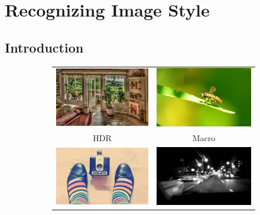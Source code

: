 \chapter{Recognizing Image Style}

\section{Introduction}
\begin{figure}[t]
\small{
\centering
\begin{subfigure}[t]{0.48\linewidth}
    \begin{tabular}{cc}
        \includegraphics[width=.43\linewidth]{../style/figures/flickrDatasetExamples/used/resized/hdr.jpg} &
    \includegraphics[width=.43\linewidth]{../style/figures/flickrDatasetExamples/used/resized/macro.jpg} \\
    HDR & Macro \\
        \includegraphics[width=.43\linewidth]{../style/figures/flickrDatasetExamples/used/resized/vintage.jpg} &
    \includegraphics[width=.43\linewidth]{../style/figures/flickrDatasetExamples/used/resized/noir.jpg} \\

\end{tabular}
\end{subfigure}}
\end{figure}
